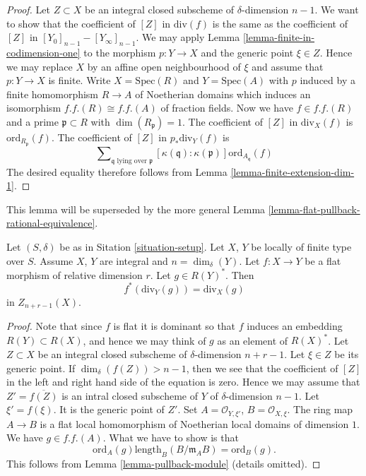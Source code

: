 \begin{proof}
\medskip\noindent
Let $Z \subset X$ be an integral closed subscheme of $\delta$-dimension
$n - 1$. We want to show that the coefficient of $[Z]$ in $\text{div}(f)$
is the same as the coefficient of $[Z]$ in
$[Y_0]_{n - 1} - [Y_\infty]_{n - 1}$.
We may apply Lemma \ref{lemma-finite-in-codimension-one}
to the morphism $p : Y \to X$ and
the generic point $\xi \in Z$. Hence we may replace $X$ by an
affine open neighbourhood of $\xi$ and assume that $p : Y \to X$ is finite.
Write $X = \text{Spec}(R)$ and $Y = \text{Spec}(A)$ with $p$ induced
by a finite homomorphism $R \to A$ of Noetherian domains which induces
an isomorphism $f.f.(R) \cong f.f.(A)$ of fraction fields.
Now we have $f \in f.f.(R)$ and a prime $\mathfrak p \subset R$
with $\dim(R_{\mathfrak p}) = 1$. The coefficient of
$[Z]$ in $\text{div}_X(f)$ is $\text{ord}_{R_\mathfrak p}(f)$.
The coefficient of $[Z]$ in $p_*\text{div}_Y(f)$ is
$$
\sum\nolimits_{\mathfrak q\text{ lying over }\mathfrak p}
[\kappa(\mathfrak q) : \kappa(\mathfrak p)]
\text{ord}_{A_{\mathfrak q}}(f)
$$
The desired equality therefore follows from
Lemma \ref{lemma-finite-extension-dim-1}.
\end{proof}

\noindent
This lemma will be superseded by the more general
Lemma \ref{lemma-flat-pullback-rational-equivalence}.

\begin{lemma}
\label{lemma-flat-pullback-principal-divisor}
Let $(S, \delta)$ be as in Sitation \ref{situation-setup}.
Let $X$, $Y$ be locally of finite type over $S$. Assume $X$, $Y$
are integral and $n = \dim_\delta(Y)$.
Let $f : X \to Y$ be a flat morphism of relative dimension $r$.
Let $g \in R(Y)^*$. Then
$$
f^*(\text{div}_Y(g)) = \text{div}_X(g)
$$
in $Z_{n + r - 1}(X)$.
\end{lemma}

\begin{proof}
Note that since $f$ is flat it is dominant so that
$f$ induces an embedding $R(Y) \subset R(X)$, and hence
we may think of $g$ as an element of $R(X)^*$.
Let $Z \subset X$ be an integral closed subscheme of
$\delta$-dimension $n + r - 1$. Let $\xi \in Z$
be its generic point. If $\dim_\delta(f(Z)) > n - 1$,
then we see that the coefficient of $[Z]$ in the left and
right hand side of the equation is zero.
Hence we may assume that $Z' = \overline{f(Z)}$ is an
intral closed subscheme of $Y$ of $\delta$-dimension $n - 1$.
Let $\xi' = f(\xi)$. It is the generic point of $Z'$.
Set $A = \mathcal{O}_{Y, \xi'}$, $B = \mathcal{O}_{X, \xi}$.
The ring map $A \to B$ is a flat local homomorphism of
Noetherian local domains of dimension $1$.
We have $g \in f.f.(A)$. What we have to show is that
$$
\text{ord}_A(g) \text{length}_B(B/\mathfrak m_AB)
=
\text{ord}_B(g).
$$
This follows from Lemma \ref{lemma-pullback-module}
(details omitted).
\end{proof}











